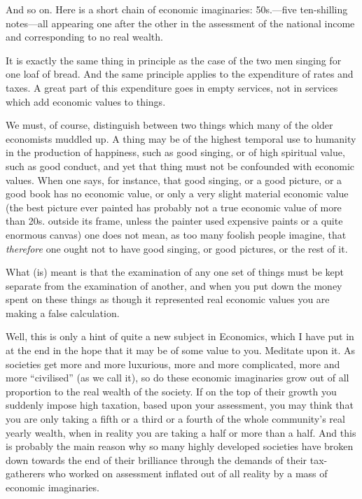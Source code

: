 \documentclass{book}
\begin{document}
And so on. Here is a short chain of economic imaginaries: 50s.—five ten-shilling notes—all appearing one after the other in the assessment of the national income and corresponding to no real wealth.

It is exactly the same thing in principle as the case of the two men singing for one loaf of bread. And the same principle applies to the expenditure of rates and taxes. A great part of this expenditure goes in empty services, not in services which add economic values to things.

We must, of course, distinguish between two things which many of the older economists muddled up. A thing may be of the highest temporal use to humanity in the production of happiness, such as good singing, or of high spiritual value, such as good conduct, and yet that thing must not be confounded with economic values. When one says, for instance, that good singing, or a good picture, or a good book has no economic value, or only a very slight material economic value (the best picture ever painted has probably not a true economic value of more than 20s. outside its frame, unless the painter used expensive paints or a quite enormous canvas) one does not mean, as too many foolish people imagine, that \emph{therefore} one ought not to have good singing, or good pictures, or the rest of it.

What (is) meant is that the examination of any one set of things must be kept separate from the examination of another, and when you put down the money spent on these things as though it represented real economic values you are making a false calculation.

Well, this is only a hint of quite a new subject in Economics, which I have put in at the end in the hope that it may be of some value to you. Meditate upon it. As societies get more and more luxurious, more and more complicated, more and more “civilised” (as we call it), so do these economic imaginaries grow out of all proportion to the real wealth of the society. If on the top of their growth you suddenly impose high taxation, based upon your assessment, you may think that you are only taking a fifth or a third or a fourth of the whole community’s real yearly wealth, when in reality you are taking a half or more than a half. And this is probably the main reason why so many highly developed societies have broken down towards the end of their brilliance through the demands of their tax-gatherers who worked on assessment inflated out of all reality by a mass of economic imaginaries.
\end{document}
